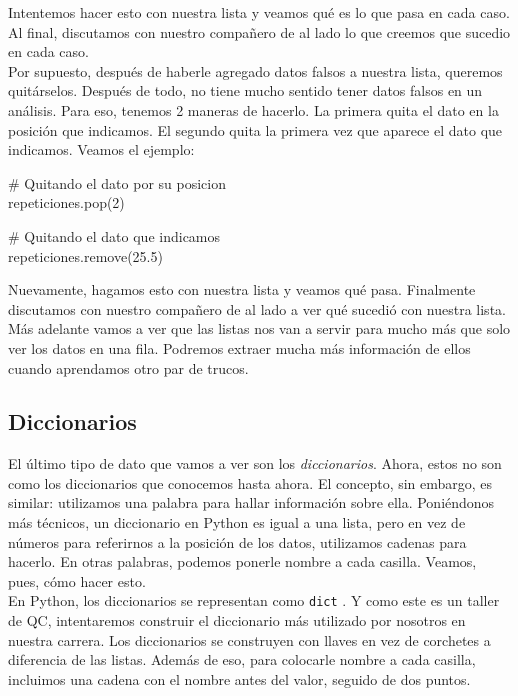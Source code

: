 \documentclass[10pt,letterpaper]{article}
\newcommand{\inlinecode}[1]{
\colorbox{light-gray}{\texttt{#1}}
}
\newenvironment{Code}
{
\begin{lrbox}{\selvestebox}%
\begin{minipage}{\dimexpr\columnwidth-2\fboxsep\relax}
\fontfamily{\ttdefault}\selectfont
}
{\end{minipage}\end{lrbox}%
\begin{center}
\colorbox{light-gray}{\usebox{\selvestebox}}
\end{center}
}
\begin{document}
Intentemos hacer esto con nuestra lista y veamos qu\'e es lo que pasa en cada caso. Al final, discutamos con nuestro compa\~nero de al lado lo que creemos que sucedio en cada caso.\\

Por supuesto, despu\'es de haberle agregado datos falsos a nuestra lista, queremos quit\'arselos. Despu\'es de todo, no tiene mucho sentido tener datos falsos en un an\'alisis. Para eso, tenemos 2 maneras de hacerlo. La primera quita el dato en la posici\'on que indicamos. El segundo quita la primera vez que aparece el dato que indicamos. Veamos el ejemplo:

\begin{Code}
\# Quitando el dato por su posicion\\
repeticiones.pop(2)

\# Quitando el dato que indicamos\\
repeticiones.remove(25.5)
\end{Code}

Nuevamente, hagamos esto con nuestra lista y veamos qu\'e pasa. Finalmente discutamos con nuestro compa\~nero de al lado a ver qu\'e sucedi\'o con nuestra lista.\\

M\'as adelante vamos a ver que las listas nos van a servir para mucho m\'as que solo ver los datos en una fila. Podremos extraer mucha m\'as informaci\'on de ellos cuando aprendamos otro par de trucos.

\subsection{Diccionarios}
El \'ultimo tipo de dato que vamos a ver son los \emph{diccionarios}. Ahora, estos no son como los diccionarios que conocemos hasta ahora. El concepto, sin embargo, es similar: utilizamos una palabra para hallar informaci\'on sobre ella. Poni\'endonos m\'as t\'ecnicos, un diccionario en Python es igual a una lista, pero en vez de n\'umeros para referirnos a la posici\'on de los datos, utilizamos cadenas para hacerlo. En otras palabras, podemos ponerle nombre a cada casilla. Veamos, pues, c\'omo hacer esto.\\

En Python, los diccionarios se representan como \inlinecode{dict}. Y como este es un taller de QC, intentaremos construir el diccionario m\'as utilizado por nosotros en nuestra carrera. Los diccionarios se construyen con llaves en vez de corchetes a diferencia de las listas. Adem\'as de eso, para colocarle nombre a cada casilla, incluimos una cadena con el nombre antes del valor, seguido de dos puntos.
\end{document}
